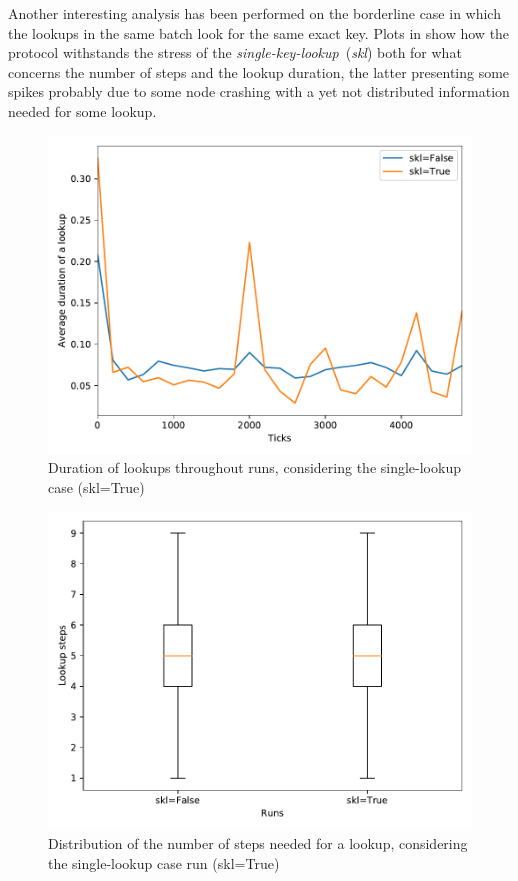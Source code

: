 \documentclass[11pt,twocolumn,letterpaper]{article}
\begin{document}
	Another interesting analysis has been performed on the borderline case in which the lookups in the same batch look for the same exact key. Plots in  show how the protocol withstands the stress of the \textit{single-key-lookup}~(\textit{skl}) both for what concerns the number of steps and the lookup duration, the latter presenting some spikes probably due to some node crashing with a yet not distributed information needed for some lookup.

	\begin{figure}[ht]
		\centering
		\includegraphics[width=\linewidth,clip,trim=0 0.5cm 0 0.35cm]{figures/analysis3/skl_lookupduration_time.pdf}
		\caption{Duration of lookups throughout runs, considering the single-lookup case (skl=True)}
		\label{fig:keys2}
	\end{figure}
	\begin{figure}[ht]
		\centering
		\includegraphics[width=\linewidth,clip,trim=0 0.5cm 0 0.35cm]{figures/analysis3/skl_lookuplength_box.pdf}
		\caption{Distribution of the number of steps needed for a lookup, considering the single-lookup case run (skl=True)}
		\label{fig:keys3}
	\end{figure}
	
\end{document}
